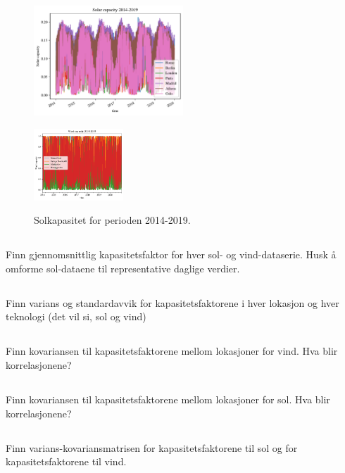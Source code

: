 \documentclass{article}
\begin{document}
\begin{figure}[h]
    \centering
    \includegraphics[width=0.5\textwidth]{oblig/figures/Solar/Solar capacity 2014-2019.pdf}
    \caption{Solkapasitet for perioden 2014-2019.}
    \includegraphics[width=0.3\textwidth]{oblig/figures/Wind/Wind capacity 2014-2019.pdf}
    \label{fig:total_solar}
\end{figure}

\subsection{}
Finn gjennomsnittlig kapasitetsfaktor for hver sol- og vind-dataserie. Husk å omforme sol-dataene til representative daglige verdier.

\subsection{}
Finn varians og standardavvik for kapasitetsfaktorene i hver lokasjon og hver teknologi (det vil si, sol og vind)

\subsection{}
Finn kovariansen til kapasitetsfaktorene mellom lokasjoner for vind. Hva blir korrelasjonene?

\subsection{}
Finn kovariansen til kapasitetsfaktorene mellom lokasjoner for sol. Hva blir korrelasjonene?

\subsection{}
Finn varians-kovariansmatrisen for kapasitetsfaktorene til sol og for kapasitetsfaktorene til vind.
\end{document}
